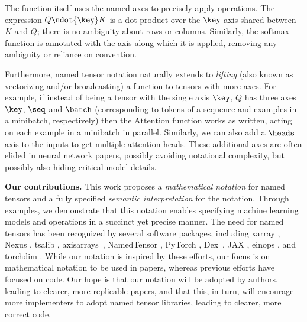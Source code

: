 The function itself uses the named axes to precisely apply operations.  The expression $Q \ndot{\key} K$ is a dot product over the $\key$ axis shared between $K$ and $Q$; there is no ambiguity about rows or columns. Similarly, the softmax function is annotated with the axis along which it is applied, removing any ambiguity or reliance on convention. 

Furthermore, named tensor notation naturally extends to \textit{lifting} (also known as vectorizing and/or broadcasting) a function to tensors with more axes. For example, if instead of being a tensor with the single axis $\key$, $Q$  has three axes $\key$, $\seq$ and $\batch$  (corresponding to tokens of a sequence and examples in a minibatch, respectively) then the $\text{Attention}$ function works as written, acting on each example in a minibatch in parallel.
Similarly, we can also add a $\heads$ axis to the inputs to get multiple attention heads.
These additional axes are often elided in neural network papers, possibly avoiding notational complexity, but possibly also hiding critical model details. 

\textbf{Our contributions.}  This work proposes a \emph{mathematical notation} for named tensors and a fully specified \emph{semantic interpretation} for the notation.
Through examples, we demonstrate that this notation enables specifying machine learning models and operations in a succinct yet precise manner.
The need for named tensors has been recognized by several software packages, including xarray \citep{xarray}, Nexus \citep{chen2017typesafe}, tsalib \citep{tsalib}, axisarrays~\citep{axisarrays}, NamedTensor \citep{namedtensor}, PyTorch \citep{named-tensors}, Dex~\citep{dex}, JAX \citep{jax_xmap}, einops \citep{einops}, and torchdim \citep{torchdim}. While our notation is inspired by these efforts, our focus is on mathematical notation to be used in papers, whereas previous efforts have focused on code. Our hope is that our notation will be adopted by authors, leading to clearer, more replicable papers, and that this, in turn, will encourage more implementers to adopt named tensor libraries, leading to clearer, more correct code.

